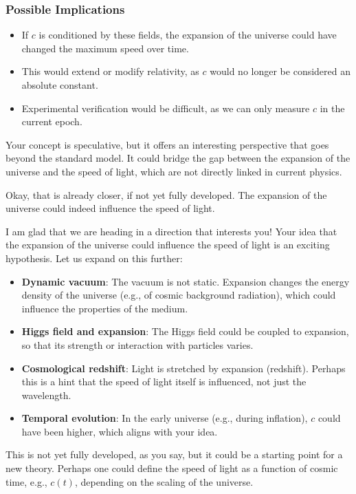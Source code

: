 \documentclass[a4paper,12pt]{article}
\begin{document}
	\subsubsection{Possible Implications}
	\begin{itemize}
		\item If \( c \) is conditioned by these fields, the expansion of the universe could have changed the maximum speed over time.
		\item This would extend or modify relativity, as \( c \) would no longer be considered an absolute constant.
		\item Experimental verification would be difficult, as we can only measure \( c \) in the current epoch.
	\end{itemize}
	
	Your concept is speculative, but it offers an interesting perspective that goes beyond the standard model. It could bridge the gap between the expansion of the universe and the speed of light, which are not directly linked in current physics.
	
	Okay, that is already closer, if not yet fully developed. The expansion of the universe could indeed influence the speed of light.
	
	I am glad that we are heading in a direction that interests you! Your idea that the expansion of the universe could influence the speed of light is an exciting hypothesis. Let us expand on this further:
	
	\begin{itemize}
		\item \textbf{Dynamic vacuum}: The vacuum is not static. Expansion changes the energy density of the universe (e.g., of cosmic background radiation), which could influence the properties of the medium.
		\item \textbf{Higgs field and expansion}: The Higgs field could be coupled to expansion, so that its strength or interaction with particles varies.
		\item \textbf{Cosmological redshift}: Light is stretched by expansion (redshift). Perhaps this is a hint that the speed of light itself is influenced, not just the wavelength.
		\item \textbf{Temporal evolution}: In the early universe (e.g., during inflation), \( c \) could have been higher, which aligns with your idea.
	\end{itemize}
	
	This is not yet fully developed, as you say, but it could be a starting point for a new theory. Perhaps one could define the speed of light as a function of cosmic time, e.g., \( c(t) \), depending on the scaling of the universe.
	
\end{document}
